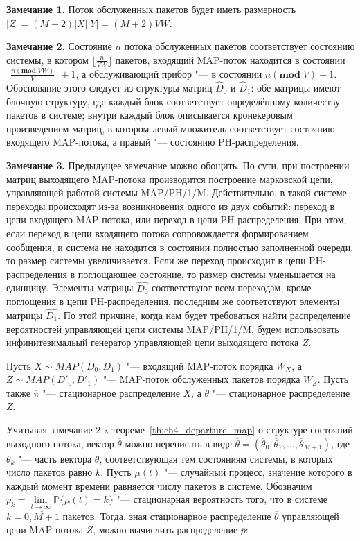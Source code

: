 \textbf{Замечание 1.} Поток обслуженных пакетов будет иметь размерность $|Z| = (M+2) |X| |Y| = (M+2)VW$.

\textbf{Замечание 2.} Состояние $n$ потока обслуженных пакетов соответствует состоянию системы, в котором $\lfloor \frac{n}{VW} \rfloor$ пакетов, входящий MAP-поток находится в состоянии $\lfloor \frac{n (\mathbf{mod}\;VW)}{V} \rfloor + 1$, а обслуживающий прибор "--- в состоянии $n (\mathbf{mod}\;V) + 1$. Обоснование этого следует из структуры матриц $\hat{D}_0$ и $\hat{D}_1$: обе матрицы имеют блочную структуру, где каждый блок соответствует определённому количеству пакетов в системе; внутри каждый блок описывается кронекеровым произведением матриц, в котором левый множитель соответствует состоянию входящего MAP-потока, а правый "--- состоянию PH-распределения.

\textbf{Замечание 3.} Предыдущее замечание можно обощить. По сути, при построении матриц выходящего MAP-потока производится построение марковской цепи, управляющей работой системы MAP/PH/1/M. Действительно, в такой системе переходы происходят из-за возникновения одного из двух событий: переход в цепи входящего MAP-потока, или переход в цепи PH-распределения. При этом, если переход в цепи входящего потока сопровождается формированием сообщения, и система не находится в состоянии полностью заполненной очереди, то размер системы увеличивается. Если же переход происходит в цепи PH-распределения в поглощающее состояние, то размер системы уменьшается на единцицу. Элементы матрицы $\hat{D_0}$ соответствуют всем переходам, кроме поглощения в цепи PH-распределения, последним же соответствуют элементы матрицы $\hat{D_1}$. По этой причине, когда нам будет требоваться найти распределение вероятностей управляющей цепи системы MAP/PH/1/M, будем использовать инфинитезимальый генератор управляющей цепи выходящего потока $Z$.

Пусть $X \sim MAP(D_0, D_1)$ "--- входящий MAP-поток порядка $W_X$, а $Z \sim MAP(D'_0, D'_1)$ "--- MAP-поток обслуженных пакетов порядка $W_Z$. Пусть также $\overline{\pi}$ "--- стационарное распределение $X$, а $\overline{\theta}$ "--- стационарное распределение $Z$.

Учитывая замечание 2 к теореме~\ref{th:ch4_departure_map} о структуре состояний выходного потока, вектор $\overline{\theta}$ можно переписать в виде $\overline{\theta} = (\overline{\theta}_0, \overline{\theta}_1, \dots, \overline{\theta}_{M+1})$, где $\overline{\theta}_k$ "--- часть вектора $\overline{\theta}$, соответствующая тем состояниям системы, в которых число пакетов равно $k$. Пусть $\mu(t)$ "--- случайный процесс, значение которого в каждый момент времени равняется числу пакетов в системе. Обозначим $p_k = \lim\limits_{t \rightarrow \infty} \mathbb{P}\{\mu(t) = k\}$ "--- стационарная вероятность того, что в системе $k=\overline{0,M+1}$ пакетов. Тогда, зная стационарное распределение $\overline{\theta}$ управляющей цепи MAP-потока $Z$, можно вычислить распределение $\overline{p}$:

